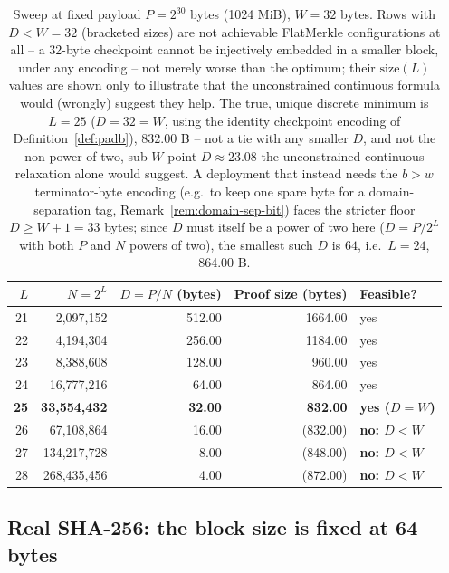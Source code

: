 \begin{table}[H]
\centering
\begin{tabular}{@{}rrrrl@{}}
\toprule
$L$ & $N = 2^L$ & $D = P/N$ (bytes) & Proof size (bytes) & Feasible? \\
\midrule
21 &   2{,}097{,}152 & 512.00 & 1664.00 & yes \\
22 &   4{,}194{,}304 & 256.00 & 1184.00 & yes \\
23 &   8{,}388{,}608 & 128.00 &  960.00 & yes \\
24 &  16{,}777{,}216 &  64.00 &  864.00 & yes \\
\textbf{25} &  \textbf{33{,}554{,}432} &  \textbf{32.00} &  \textbf{832.00} & \textbf{yes ($D=W$)} \\
26 &  67{,}108{,}864 &  16.00 &  (832.00) & \textbf{no: $D<W$} \\
27 & 134{,}217{,}728 &   8.00 &  (848.00) & \textbf{no: $D<W$} \\
28 & 268{,}435{,}456 &   4.00 &  (872.00) & \textbf{no: $D<W$} \\
\bottomrule
\end{tabular}
\caption{Sweep at fixed payload $P = 2^{30}$ bytes (1024 MiB), $W=32$
bytes. Rows with $D<W=32$ (bracketed sizes) are not achievable FlatMerkle
configurations at all -- a 32-byte checkpoint cannot be injectively
embedded in a smaller block, under any encoding -- not merely worse than
the optimum; their $\mathrm{size}(L)$ values are shown only to illustrate
that the unconstrained continuous formula would (wrongly) suggest they
help. The true, unique discrete minimum is $L=25$ ($D=32=W$, using the
identity checkpoint encoding of Definition~\ref{def:padb}), 832.00 B --
not a tie with any smaller $D$, and not the non-power-of-two, sub-$W$
point $D\approx23.08$ the unconstrained continuous relaxation alone would
suggest. A deployment that instead needs the $b>w$ terminator-byte
encoding (e.g.\ to keep one spare byte for a domain-separation tag,
Remark~\ref{rem:domain-sep-bit}) faces the stricter floor $D \ge W+1=33$
bytes; since $D$ must itself be a power of two here ($D=P/2^L$ with both
$P$ and $N$ powers of two), the smallest such $D$ is $64$, i.e.\ $L=24$,
864.00 B.}
\label{tab:optimal-toy}
\end{table}

\subsection{Real SHA-256: the block size is fixed at 64 bytes}
\label{sec:optimal-real}

